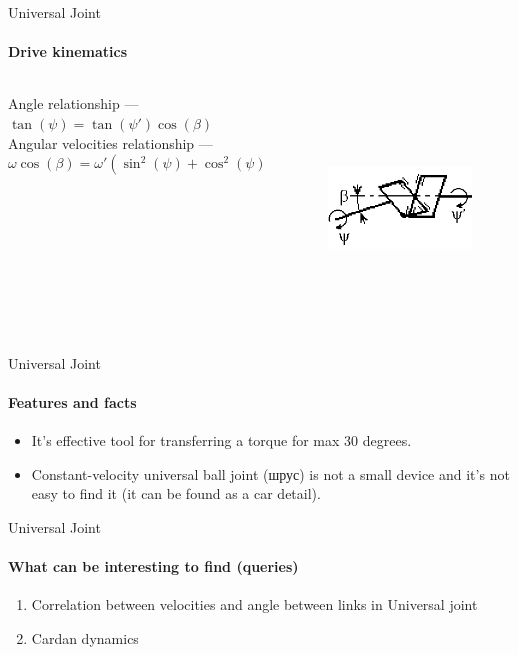 \documentclass[aspectratio=169]{beamer}
\begin{document}
\begin{frame}[t]{Universal Joint}
    \framesubtitle{Drive kinematics}
    \begin{columns}[T,onlytextwidth]
        \begin{column}{0.59\textwidth}
            Angle relationship --- $\tan(\psi)=\tan(\psi')\cos(\beta)$ \\
            Angular velocities relationship --- $ \omega \cos(\beta) = \omega'(\sin^2(\psi) + \cos^2(\psi)\cos^2(\beta))$
        \end{column}
        \begin{column}{0.39\textwidth}
            \vspace{-0.9cm}
            \begin{figure}[H]
                \centering\includegraphics[height=6cm,width=1\textwidth,keepaspectratio]{universal_kinematics.png}
                \label{fig:universal_kinematics.png}
            \end{figure}
        \end{column}
    \end{columns}

\end{frame}

\begin{frame}[t]{Universal Joint}
    \framesubtitle{Features and facts}
    \begin{itemize}
        \item It's effective tool for transferring a torque for max 30 degrees.
        \item Constant-velocity universal ball joint (шрус) is not a small device and it's not easy to find it (it can be found as a car detail).
    \end{itemize}
\end{frame}

\begin{frame}[t]{Universal Joint}
    \framesubtitle{What can be interesting to find (queries)}
    \begin{enumerate}
        \item Correlation between velocities and angle between links in Universal joint
        \item Cardan dynamics
    \end{enumerate}
\end{frame}
\end{document}
